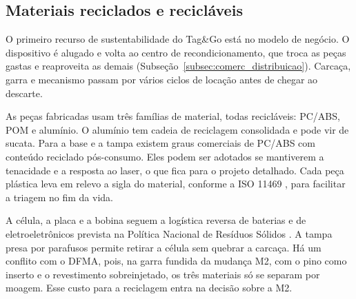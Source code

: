\subsection{Materiais reciclados e recicláveis}
\label{subsec:const_reciclagem}

O primeiro recurso de sustentabilidade do Tag\&Go está no modelo de negócio. O dispositivo é alugado e volta ao centro de recondicionamento, que troca as peças gastas e reaproveita as demais (Subseção~\ref{subsec:comerc_distribuicao}). Carcaça, garra e mecanismo passam por vários ciclos de locação antes de chegar ao descarte.

As peças fabricadas usam três famílias de material, todas recicláveis: PC/ABS, POM e alumínio. O alumínio tem cadeia de reciclagem consolidada e pode vir de sucata. Para a base e a tampa existem graus comerciais de PC/ABS com conteúdo reciclado pós-consumo. Eles podem ser adotados se mantiverem a tenacidade e a resposta ao laser, o que fica para o projeto detalhado. Cada peça plástica leva em relevo a sigla do material, conforme a ISO 11469 \cite{iso11469}, para facilitar a triagem no fim da vida.

A célula, a placa e a bobina seguem a logística reversa de baterias e de eletroeletrônicos prevista na Política Nacional de Resíduos Sólidos \cite{brasil2010pnrs}. A tampa presa por parafusos permite retirar a célula sem quebrar a carcaça. Há um conflito com o DFMA, pois, na garra fundida da mudança M2, com o pino como inserto e o revestimento sobreinjetado, os três materiais só se separam por moagem. Esse custo para a reciclagem entra na decisão sobre a M2.

